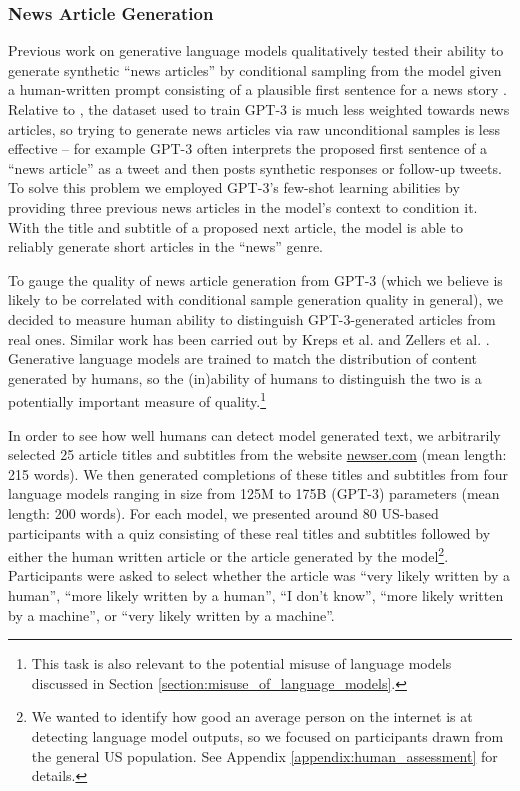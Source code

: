         \subsubsection{News Article Generation}
        \label{section:News_Article_Generation}

Previous work on generative language models qualitatively tested their ability to generate synthetic ``news articles'' by conditional sampling from the model given a human-written prompt consisting of a plausible first sentence for a news story \cite{radford2019language}.  Relative to \cite{radford2019language}, the dataset used to train GPT-3 is much less weighted towards news articles, so trying to generate news articles via raw unconditional samples is less effective -- for example GPT-3 often interprets the proposed first sentence of a ``news article'' as a tweet and then posts synthetic responses or follow-up tweets.  To solve this problem we employed GPT-3’s few-shot learning abilities by providing three previous news articles in the model’s context to condition it.  With the title and subtitle of a proposed next article, the model is able to reliably generate short articles in the ``news'' genre.

To gauge the quality of news article generation from GPT-3 (which we believe is likely to be correlated with conditional sample generation quality in general), we decided to measure human ability to distinguish GPT-3-generated articles from real ones. Similar work has been carried out by Kreps et al. \cite{kreps-all-the-news} and Zellers et al. \cite{zellers2019defending}. Generative language models are trained to match the distribution of content generated by humans, so the (in)ability of humans to distinguish the two is a potentially important measure of quality.\footnote{This task is also relevant to the potential misuse of language models discussed in Section \ref{section:misuse_of_language_models}.} 

In order to see how well humans can detect model generated text, we arbitrarily selected 25 article titles and subtitles from the website \href{newser.com}{newser.com} (mean length: 215 words). We then generated completions of these titles and subtitles from four language models ranging in size from 125M to 175B (GPT-3) parameters (mean length: 200 words). For each model, we presented around 80 US-based participants with a quiz consisting of these real titles and subtitles followed by either the human written article or the article generated by the model\footnote{We wanted to identify how good an average person on the internet is at detecting language model outputs, so we focused on participants drawn from the general US population. See Appendix \ref{appendix:human_assessment} for details.}. Participants were asked to select whether the article was ``very likely written by a human'', ``more likely written by a human'', ``I don't know'', ``more likely written by a machine'', or ``very likely written by a machine''.

